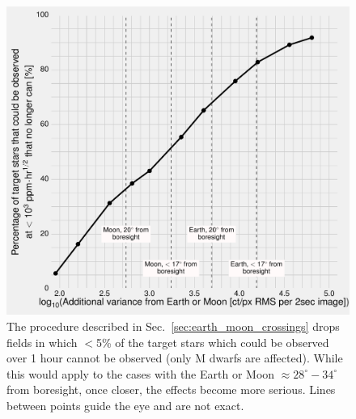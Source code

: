 \begin{figure}[!th] %
	\centering
	\includegraphics{figures/outage_vs_addedRMS}
	\caption{The procedure described in Sec.~\protect\ref{sec:earth_moon_crossings} drops fields in which $<$5\% of the target stars which could be observed over 1 hour cannot be observed (only M dwarfs are affected). While this would apply to the cases with the Earth or Moon $\approx 28^\circ - 34^\circ$ from boresight, once closer, the effects become more serious. Lines between points guide the eye and are not exact.}
	\label{fig:outage_vs_background}
\end{figure}
\newpage

